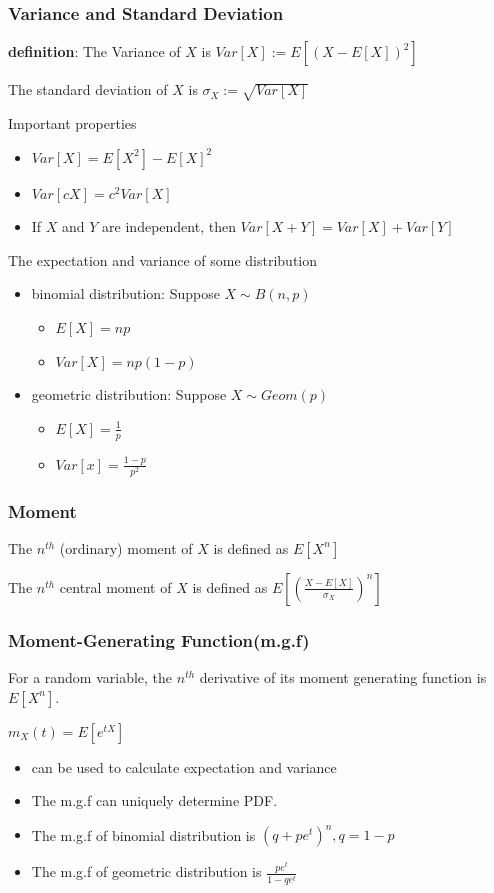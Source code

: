 \documentclass{beamer}
\begin{document}
\begin{frame}
    \frametitle{Variance and Standard Deviation}
    \textbf{definition}: The Variance of $X$ is $Var[X]:=E[(X-E[X])^2]$\par
    The standard deviation of $X$ is $\sigma_X:=\sqrt{Var[X]}$\par
    \vspace{0.3cm}
    Important properties
    \begin{itemize}
        \item $Var[X]=E[X^2]-E[X]^2$
        \item $Var[cX]=c^2 Var[X]$
        \item If $X$ and $Y$ are independent, then $Var[X+Y]=Var[X]+Var[Y]$
    \end{itemize}
    The expectation and variance of some distribution
    \begin{itemize}
        \item binomial distribution: Suppose $X\sim B(n,p)$
        \begin{itemize}
            \item $E[X]=np$
            \item $Var[X]=np(1-p)$
        \end{itemize}
        \item geometric distribution: Suppose $X\sim Geom(p)$
        \begin{itemize}
            \item $E[X]=\frac{1}{p}$
            \item $Var[x]=\frac{1-p}{p^2}$
        \end{itemize}
    \end{itemize}

    
\end{frame}

\begin{frame}
    \frametitle{Moment}
    The \textbf{$n^{th}$} (ordinary) moment of $X$ is defined as $E[X^n]$\par
    \vspace{0.3cm}
    The \textbf{$n^{th}$} central moment of $X$ is defined as $E[(\frac{X-E[X]}{\sigma_X})^n]$\par
\end{frame}

\begin{frame}
    \frametitle{Moment-Generating Function(m.g.f)}
    For a random variable, the $n^{th}$ derivative of its moment generating function is $E[X^n]$.\par
    $m_X(t)=E[e^{tX}]$
    \begin{itemize}
        \item can be used to calculate expectation and variance
        \item The m.g.f can uniquely determine PDF.
        \item The m.g.f of binomial distribution is $(q+pe^t)^n, q=1-p$
        \item The m.g.f of geometric distribution is $\frac{pe^t}{1-qe^t}$
    \end{itemize}
    
\end{frame}
\end{document}
